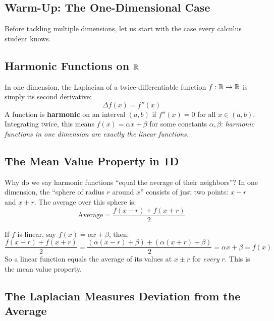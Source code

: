 \begin{notechapter}
\section{Warm-Up: The One-Dimensional Case}
\label{harmonic-functions:sec:1d}

Before tackling multiple dimensions, let us start with the case every
calculus student knows.

\subsection{Harmonic Functions on \texorpdfstring{$\mathbb{R}$}{R}}

In one dimension, the Laplacian of a twice-differentiable function
$f : \mathbb{R} \to \mathbb{R}$ is simply its second derivative:
\begin{equation}
\Delta f(x) = f''(x)
\end{equation}
A function is \textbf{harmonic} on an interval $(a,b)$ if $f''(x) = 0$ for
all $x \in (a,b)$. Integrating twice, this means $f(x) = \alpha x + \beta$
for some constants $\alpha, \beta$: \emph{harmonic functions in one dimension
are exactly the linear functions.}

\subsection{The Mean Value Property in 1D}

Why do we say harmonic functions ``equal the average of their neighbors''?
In one dimension, the ``sphere of radius $r$ around $x$'' consists of just
two points: $x - r$ and $x + r$. The average over this sphere is:
\begin{equation}
\text{Average} = \frac{f(x-r) + f(x+r)}{2}
\end{equation}

If $f$ is linear, say $f(x) = \alpha x + \beta$, then:
\[
\frac{f(x-r) + f(x+r)}{2}
= \frac{(\alpha(x-r) + \beta) + (\alpha(x+r) + \beta)}{2}
= \alpha x + \beta = f(x)
\]
So a linear function equals the average of its values at $x \pm r$ for
\emph{every} $r$. This is the mean value property.

\subsection{The Laplacian Measures Deviation from the Average}


\end{notechapter}
